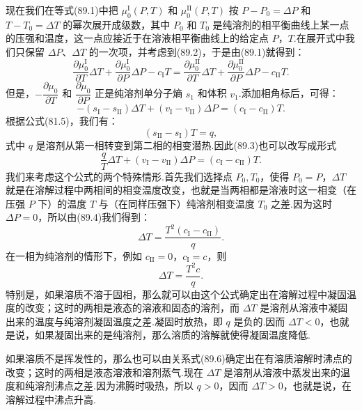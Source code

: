 现在我们在等式(89.1)中把 $\mu_0^{\mathrm{I}}(P,T)$ 和 $\mu_0^{\mathrm{II}}(P,T)$ 按 $P-P_0=\Delta P$ 和 $T-T_0=\Delta T$ 的幂次展开成级数，其中 $P_0$ 和 $T_0$ 是纯溶剂的相平衡曲线上某一点的压强和温度，这一点应接近于在溶液相平衡曲线上的给定点 $P$，$T$.在展开式中我们只保留 $\Delta P$、$\Delta T$ 的一次项，并考虑到(89.2)，于是由(89.1)就得到：
\begin{equation*}
  \frac{\partial\mu_0^{\mathrm{I}}}{\partial T}\Delta T
  +\frac{\partial\mu_0^{\mathrm{I}}}{\partial P}\Delta P-c_{\mathrm{I}}T
  =\frac{\partial\mu_0^{\mathrm{II}}}{\partial T}\Delta T
  +\frac{\partial\mu_0^{\mathrm{II}}}{\partial P}\Delta P-c_{\mathrm{II}}T.
\end{equation*}
但是，$-\dfrac{\partial\mu_0}{\partial T}$ 和 $\dfrac{\partial\mu_0}{\partial P}$ 正是纯溶剂单分子熵 $s_1$ 和体积 $v_1$.添加相角标后，可得：
\begin{equation}
  -(s_{\mathrm{I}}-s_{\mathrm{II}})\Delta T
  +(v_{\mathrm{I}}-v_{\mathrm{II}})\Delta P
  =(c_{\mathrm{I}}-c_{\mathrm{II}})T.
\end{equation}
根据公式(81.5)，我们有：
\begin{equation*}
  (s_{\mathrm{II}}-s_{\mathrm{I}})T=q,
\end{equation*}
式中 $q$ 是溶剂从第一相转变到第二相的相变潜热.因此(89.3)也可以改写成形式
\begin{equation}
  \frac{q}{T}\Delta T+(v_{\mathrm{I}}-v_{\mathrm{II}})\Delta P
  =(c_{\mathrm{I}}-c_{\mathrm{II}})T.
\end{equation}
我们来考虑这个公式的两个特殊情形.首先我们选择点 $P_0,T_0$，使得 $P_0=P$，$\Delta T$ 就是在溶解过程中两相间的相变温度改变，也就是当两相都是溶液时这一相变（在压强 $P$ 下）的温度 $T$ 与（在同样压强下）纯溶剂相变温度 $T_0$ 之差.因为这时 $\Delta P=0$，所以由(89.4)我们得到：
\begin{equation}
  \Delta T=\frac{T^2(c_{\mathrm{I}}-c_{\mathrm{II}})}{q}.
\end{equation}
在一相为纯溶剂的情形下，例如 $c_{\mathrm{II}}=0$，$c_{\mathrm{I}}=c$，则
\begin{equation}
  \Delta T=\frac{T^2c}{q}.
\end{equation}
特别是，如果溶质不溶于固相，那么就可以由这个公式确定出在溶解过程中凝固温度的改变；这时的两相是液态的溶液和固态的溶剂，而 $\Delta T$ 是溶剂从溶液中凝固出来的温度与纯溶剂凝固温度之差.凝固时放热，即 $q$ 是负的.因而 $\Delta T<0$，也就是说，如果凝固出来的是纯溶剂，那么溶质的溶解就使得凝固温度降低.

如果溶质不是挥发性的，那么也可以由关系式(89.6)确定出在有溶质溶解时沸点的改变；这时的两相是液态溶液和溶剂蒸气.现在 $\Delta T$ 是溶剂从溶液中蒸发出来的温度和纯溶剂沸点之差.因为沸腾时吸热，所以 $q>0$，因而 $\Delta T>0$，也就是说，在溶解过程中沸点升高.

